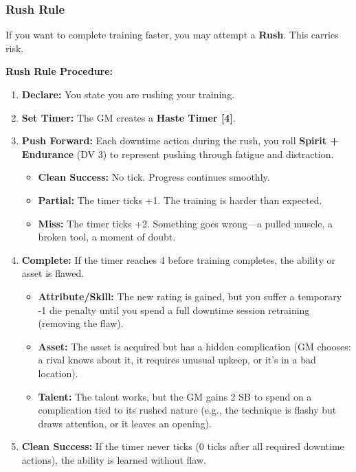 \subsubsection{Rush Rule}
\label{sec:downtime-rush}

If you want to complete training faster, you may attempt a \textbf{Rush}. This carries risk.

\textbf{Rush Rule Procedure:}

\begin{enumerate}
  \item \textbf{Declare:} You state you are rushing your training.
  \item \textbf{Set Timer:} The GM creates a \textbf{Haste Timer [4]}.
  \item \textbf{Push Forward:} Each downtime action during the rush, you roll \textbf{Spirit + Endurance} (DV 3) to represent pushing through fatigue and distraction.
    \begin{itemize}
      \item \textbf{Clean Success:} No tick. Progress continues smoothly.
      \item \textbf{Partial:} The timer ticks +1. The training is harder than expected.
      \item \textbf{Miss:} The timer ticks +2. Something goes wrong---a pulled muscle, a broken tool, a moment of doubt.
    \end{itemize}
  \item \textbf{Complete:} If the timer reaches 4 before training completes, the ability or asset is flawed.
    \begin{itemize}
      \item \textbf{Attribute/Skill:} The new rating is gained, but you suffer a temporary -1 die penalty until you spend a full downtime session retraining (removing the flaw).
      \item \textbf{Asset:} The asset is acquired but has a hidden complication (GM chooses: a rival knows about it, it requires unusual upkeep, or it's in a bad location).
      \item \textbf{Talent:} The talent works, but the GM gains 2 SB to spend on a complication tied to its rushed nature (e.g., the technique is flashy but draws attention, or it leaves an opening).
    \end{itemize}
  \item \textbf{Clean Success:} If the timer never ticks (0 ticks after all required downtime actions), the ability is learned without flaw.
\end{enumerate}

